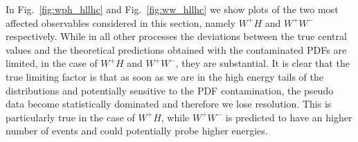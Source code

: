 \documentclass[withindex,glossary]{cam-thesis}
\begin{document}


In Fig.~\ref{fig:wph_hllhc} and Fig.~\ref{fig:ww_hllhc} we show plots of the two most affected observables considered in 
this section, namely $W^+ H$ and $W^+ W^-$ respectively.
While in all other processes the deviations between the true central values and the theoretical predictions obtained with the contaminated PDFs are limited, in the case of $W^+ H$ and $W^+ W^-$, they are substantial. 
It is clear that the true limiting factor is that as soon as we are in the high energy tails of the distributions and potentially sensitive to the PDF contamination, the pseudo data become statistically dominated and therefore we lose resolution. This is particularly true in the case of $W^+ H$, while $W^+ W^-$ is predicted to have an higher number of events and could potentially probe higher energies.
%
\end{document}
